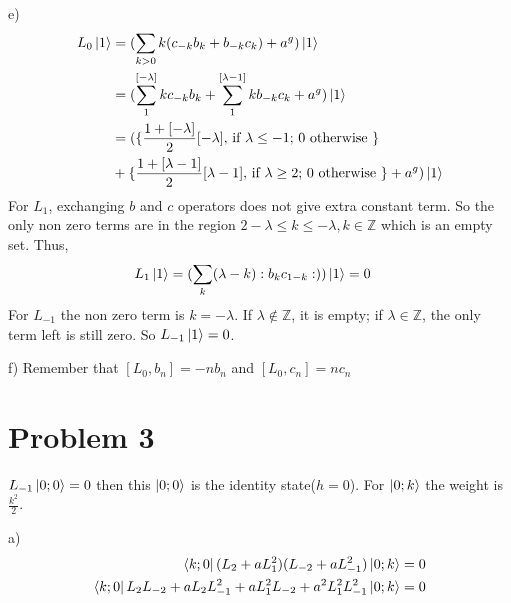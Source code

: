 \documentclass[12pt]{article}
\begin{document}
\begin{paragraph}{e)}
\begin{equation}
\begin{aligned}[t]
L_0\ket{1}&=(\sum\limits_{k>0}k(c_{-k}b_k+b_{-k}c_k)+a^g)\ket{1}\\
&=(\sum\limits_1^{[-\lambda]}kc_{-k}b_k+\sum\limits_1^{[\lambda-1]}kb_{-k}c_k+a^g)\ket{1}\\
&=(\{\frac{1+[-\lambda]}{2}[-\lambda],\,\text{if }\lambda\leq -1;\,0 \text{ otherwise }\}\\
&+\{\frac{1+[\lambda-1]}{2}[\lambda-1],\,\text{if }\lambda\geq 2;\,0 \text{ otherwise }\}+a^g)\ket{1}
\end{aligned}
\end{equation}
For $L_1$, exchanging $b$ and $c$ operators does not give extra constant term. So the only non zero terms are in the region $2-\lambda\leq k\leq -\lambda, k\in \mathbb{Z}$ which is an empty set. Thus,
\begin{equation}
\begin{aligned}[t]
L_1\ket{1}&=(\sum\limits_{k}(\lambda- k):b_{k}c_{1-k}:))\ket{1}=0
\end{aligned}
\end{equation}
For $L_{-1}$ the non zero term is $k=-\lambda$. If $\lambda\not\in\mathbb{Z}$, it is empty; if $\lambda\in\mathbb{Z}$, the only term left is still zero. So $L_{-1}\ket{1}=0$.
\end{paragraph}
\begin{paragraph}{f)}
Remember that $[L_0,b_n]=-nb_n$ and $[L_0,c_n]=nc_n$
\end{paragraph}
\section{Problem 3}
$L_{-1}\ket{0;0}=0$ then this $\ket{0;0}$ is the identity state($h=0$). For $\ket{0;k}$ the weight is $\frac{k^2}{2}$.
\begin{paragraph}{a)}
\begin{equation}
\begin{aligned}[t]
\bra{k;0}(L_{2}+aL_{1}^2)(L_{-2}+aL_{-1}^2)\ket{0;k}=0\\
\bra{k;0}L_{2}L_{-2}+aL_2 L_{-1}^2+aL_1^2 L_{-2}+a^2 L_1^2 L_{-1}^2\ket{0;k}=0
\end{aligned}
\end{equation}
\end{paragraph}
\end{document}
